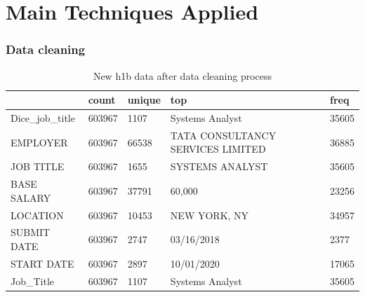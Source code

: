 \documentclass[10pt,mathserif]{beamer}
\begin{document}
\section{Main Techniques Applied}
	\begin{frame}
	\frametitle{Data cleaning}
\begin{table}[h!]
	\caption{New h1b data after data cleaning process}
	\label{newdata}
	\resizebox{\columnwidth}{!}
	{%
		
		\begin{tabular}{lllll}
			\hline
			{} &   count & unique &                                                top &   freq \\
			\hline
			Dice\_job\_title &  603967 &   1107 &                                    Systems Analyst &  35605 \\
			EMPLOYER       &  603967 &  66538 &                  TATA CONSULTANCY SERVICES LIMITED &  36885 \\
			JOB TITLE      &  603967 &   1655 &                                    SYSTEMS ANALYST &  35605 \\
			BASE SALARY    &  603967 &  37791 &                                             60,000 &  23256 \\
			LOCATION       &  603967 &  10453 &                                       NEW YORK, NY &  34957 \\
			SUBMIT DATE    &  603967 &   2747 &                                         03/16/2018 &   2377 \\
			START DATE     &  603967 &   2897 &                                         10/01/2020 &  17065 \\
			Job\_Title      &  603967 &   1107 &                                    Systems Analyst &  35605 \\
			\hline
		\end{tabular}
		
	}
	
\end{table}
\end{frame}
\end{document}
